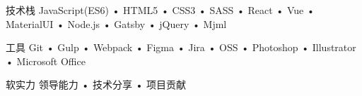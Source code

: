 

\begin{cvskills}

  \cvskill
    {技术栈} %
    {JavaScript(ES6) • HTML5 • CSS3 • SASS • React • Vue • MaterialUI • Node.js • Gatsby • jQuery • Mjml} %

  \cvskill
    {工具} %
    {Git • Gulp • Webpack • Figma • Jira • OSS • Photoshop • Illustrator • Microsoft Office} %

  \cvskill
    {软实力} %
    {领导能力 • 技术分享 • 项目贡献} %

\end{cvskills}
